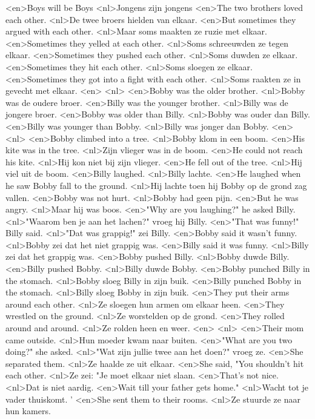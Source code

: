 <en>Boys will be Boys
<nl>Jongens zijn jongens
<en>The two brothers loved each other.
<nl>De twee broers hielden van elkaar.
<en>But sometimes they argued with each other.
<nl>Maar soms maakten ze ruzie met elkaar.
<en>Sometimes they yelled at each other.
<nl>Soms schreeuwden ze tegen elkaar.
<en>Sometimes they pushed each other.
<nl>Soms duwden ze elkaar.
<en>Sometimes they hit each other.
<nl>Soms sloegen ze elkaar.
<en>Sometimes they got into a fight with each other.
<nl>Soms raakten ze in gevecht met elkaar.
<en>
<nl>
<en>Bobby was the older brother.
<nl>Bobby was de oudere broer.
<en>Billy was the younger brother.
<nl>Billy was de jongere broer.
<en>Bobby was older than Billy.
<nl>Bobby was ouder dan Billy.
<en>Billy was younger than Bobby.
<nl>Billy was jonger dan Bobby.
<en>
<nl>
<en>Bobby climbed into a tree.
<nl>Bobby klom in een boom.
<en>His kite was in the tree.
<nl>Zijn vlieger was in de boom.
<en>He could not reach his kite.
<nl>Hij kon niet bij zijn vlieger.
<en>He fell out of the tree.
<nl>Hij viel uit de boom.
<en>Billy laughed.
<nl>Billy lachte.
<en>He laughed when he saw Bobby fall to the ground.
<nl>Hij lachte toen hij Bobby op de grond zag vallen.
<en>Bobby was not hurt.
<nl>Bobby had geen pijn.
<en>But he was angry.
<nl>Maar hij was boos.
<en>"Why are you laughing?" he asked Billy.
<nl>"Waarom ben je aan het lachen?" vroeg hij Billy.
<en>"That was funny!" Billy said.
<nl>"Dat was grappig!" zei Billy.
<en>Bobby said it wasn't funny.
<nl>Bobby zei dat het niet grappig was.
<en>Billy said it was funny.
<nl>Billy zei dat het grappig was.
<en>Bobby pushed Billy.
<nl>Bobby duwde Billy.
<en>Billy pushed Bobby.
<nl>Billy duwde Bobby.
<en>Bobby punched Billy in the stomach.
<nl>Bobby sloeg Billy in zijn buik.
<en>Billy punched Bobby in the stomach.
<nl>Billy sloeg Bobby in zijn buik.
<en>They put their arms around each other.
<nl>Ze sloegen hun armen om elkaar heen.
<en>They wrestled on the ground.
<nl>Ze worstelden op de grond.
<en>They rolled around and around.
<nl>Ze rolden heen en weer.
<en>
<nl>
<en>Their mom came outside.
<nl>Hun moeder kwam naar buiten.
<en>"What are you two doing?" she asked.
<nl>"Wat zijn jullie twee aan het doen?" vroeg ze.
<en>She separated them.
<nl>Ze haalde ze uit elkaar.
<en>She said, "You shouldn't hit each other.
<nl>Ze zei: "Je moet elkaar niet slaan.
<en>That's not nice.
<nl>Dat is niet aardig.
<en>Wait till your father gets home."
<nl>Wacht tot je vader thuiskomt. '
<en>She sent them to their rooms.
<nl>Ze stuurde ze naar hun kamers.
